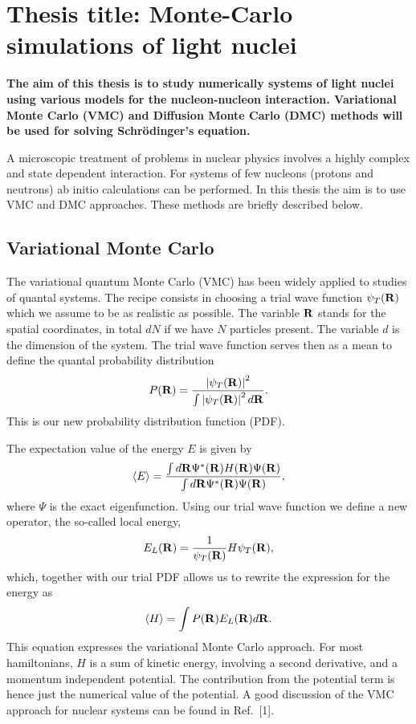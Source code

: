 \newcommand{\OP}[1]{{\bf\widehat{#1}}}

\newcommand{\be}{\begin{equation}}

\newcommand{\ee}{\end{equation}}



\pagestyle{plain}

\section*{Thesis title: Monte-Carlo simulations of light nuclei}

{\bf The aim of this thesis is to study numerically systems of
light nuclei using various models for the nucleon-nucleon interaction.
Variational Monte Carlo (VMC) and 
Diffusion Monte Carlo (DMC) methods will be used for solving 
Schr\"odinger's equation. }




A microscopic treatment of 
problems in nuclear physics involves a highly complex and state dependent
interaction. For systems of few nucleons (protons and neutrons) ab initio
calculations can be performed. In this thesis the aim is to use 
VMC and DMC approaches. These methods are briefly described below.

\subsection*{Variational Monte Carlo}
The variational quantum Monte Carlo (VMC) has been widely applied 
to studies of quantal systems. 
The recipe consists in choosing 
a trial wave function
$\psi_T({\bf R})$ which we assume to be as realistic as possible. 
The variable ${\bf R}$ stands for the spatial coordinates, in total 
$dN$ if we have $N$ particles present. The variable $d$ is the dimension
of the system. 
The trial wave function serves then as
a mean to define the quantal probability distribution 
\be
   P({\bf R})= \frac{\left|\psi_T({\bf R})\right|^2}{\int \left|\psi_T({\bf R})\right|^2d{\bf R}}.
\ee
This is our new probability distribution function  (PDF). 

The expectation value of the energy $E$
is given by
\be
   \langle E \rangle =
   \frac{\int d{\bf R}\Psi^{\ast}({\bf R})H({\bf R})\Psi({\bf R})}
        {\int d{\bf R}\Psi^{\ast}({\bf R})\Psi({\bf R})},
\ee
where $\Psi$ is the exact eigenfunction. Using our trial
wave function we define a new operator, 
the so-called  
local energy, 
\be
   E_L({\bf R})=\frac{1}{\psi_T({\bf R})}H\psi_T({\bf R}),
   \label{eq:locale1}
\ee
which, together with our trial PDF allows us to rewrite the 
expression for the energy as
\be
  \langle H \rangle =\int P({\bf R})E_L({\bf R}) d{\bf R}.
  \label{eq:vmc1}
\ee
This equation expresses the variational Monte Carlo approach.
For most hamiltonians, $H$ is a sum of kinetic energy, involving 
a second derivative, and a momentum independent potential. 
The contribution from the potential term is hence just the 
numerical value of the potential.
A good discussion of the VMC approach for nuclear systems can be found 
in Ref.~[1].
